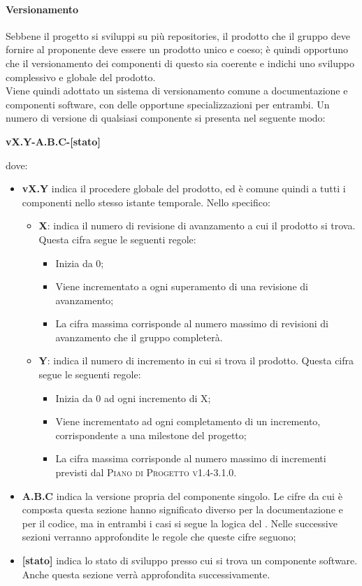 \documentclass[../norme-di-progetto.tex]{subfiles}
\begin{document}
\paragraph{Versionamento}
Sebbene il progetto si sviluppi su più repositories, il prodotto che il gruppo deve fornire al proponente deve essere un prodotto unico e coeso; è quindi opportuno che il versionamento dei componenti di questo sia coerente e indichi uno sviluppo complessivo e globale del prodotto. \\
Viene quindi adottato un sistema di versionamento comune a documentazione e componenti software, con delle opportune specializzazioni per entrambi. Un numero di versione di qualsiasi componente si presenta nel seguente modo:
\begin{center}
  \centering
  \textbf{vX.Y-A.B.C-[stato]}
\end{center} dove:
\begin{itemize}
  \item \textbf{vX.Y} indica il procedere globale del prodotto, ed è comune quindi a tutti i componenti nello stesso istante temporale. Nello specifico:
  \begin{itemize}
    \item \textbf{X}: indica il numero di revisione di avanzamento a cui il prodotto si trova. Questa cifra segue le seguenti regole:
    \begin{itemize}
      \item Inizia da 0;
      \item Viene incrementato a ogni superamento di una revisione di avanzamento;
      \item La cifra massima corrisponde al numero massimo di revisioni di avanzamento che il gruppo completerà.
    \end{itemize}
    \item \textbf{Y}: indica il numero di incremento in cui si trova il prodotto. Questa cifra segue le seguenti regole:
    \begin{itemize}
      \item Inizia da 0 ad ogni incremento di X;
      \item Viene incrementato ad ogni completamento di un incremento, corrispondente a una milestone del progetto;
      \item La cifra massima corrisponde al numero massimo di incrementi previsti dal \textsc{Piano di Progetto v1.4-3.1.0}.
    \end{itemize}
  \end{itemize}
  \item \textbf{A.B.C} indica la versione propria del componente singolo. Le cifre da cui è composta questa sezione hanno significato diverso per la documentazione e per il codice, ma in entrambi i casi si segue la logica del . Nelle successive sezioni verranno approfondite le regole che queste cifre seguono;
  \item \textbf{[stato]} indica lo stato di sviluppo presso cui si trova un componente software. Anche questa sezione verrà approfondita successivamente.
\end{itemize}
\end{document}
